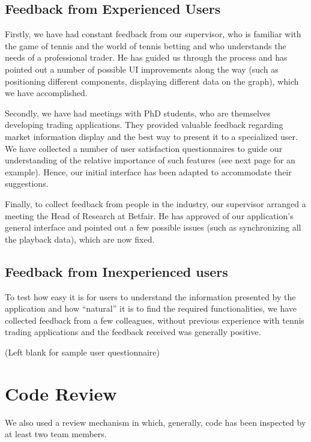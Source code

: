 \documentclass[10pt]{report}
\begin{document}
\subsection{Feedback from Experienced Users}

Firstly, we have had constant feedback from our supervisor, who is familiar with the game of tennis and the world of tennis betting and who understands the needs of a professional trader. He has guided us through the process and has pointed out a number of possible UI improvements along the way (such as positioning different components, displaying different data on the graph), which we have accomplished.
 
Secondly, we have had meetings with PhD students, who are themselves developing trading applications. They provided valuable feedback regarding market information display and the best way to present it to a specialized user. We have collected a number of user satisfaction questionnaires to guide our understanding of the relative importance of such features (see next page for an example). Hence, our initial interface has been adapted to accommodate their suggestions.

Finally, to collect feedback from people in the industry, our supervisor arranged a meeting the Head of Research at Betfair. He has approved of our application’s general interface and pointed out a few possible issues (such as synchronizing all the playback data), which are now fixed.

\subsection{Feedback from Inexperienced users}

To test how easy it is for users to understand the information presented by the application and how ``natural'' it is to find the required functionalities, we have collected feedback from a few colleagues, without previous experience with tennis trading applications and the feedback received was generally positive.

\clearpage
(Left blank for sample user questionnaire)
\clearpage


\section{Code Review}

We also used a review mechanism in which, generally, code has been inspected by at least two team members.
\end{document}
